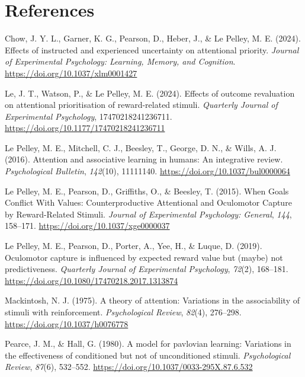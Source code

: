 \documentclass[11pt]{article}
\newlength{\cslhangindent}
\newenvironment{CSLReferences}[2] %
 {\begin{list}{}{%
  \setlength{\itemindent}{0pt}
  \setlength{\leftmargin}{0pt}
  \setlength{\parsep}{0pt}
  \ifodd #1
   \setlength{\leftmargin}{\cslhangindent}
   \setlength{\itemindent}{-1\cslhangindent}
  \fi
  \setlength{\itemsep}{#2\baselineskip}}}
 {\end{list}}
\begin{document}
\section{References}\label{references}

\label{refs}
\begin{CSLReferences}{1}{0}
Chow, J. Y. L., Garner, K. G., Pearson, D., Heber, J., \& Le Pelley, M.
E. (2024). Effects of instructed and experienced uncertainty on
attentional priority. \emph{Journal of Experimental Psychology:
Learning, Memory, and Cognition}.
\url{https://doi.org/10.1037/xlm0001427}

Le, J. T., Watson, P., \& Le Pelley, M. E. (2024). Effects of outcome
revaluation on attentional prioritisation of reward-related stimuli.
\emph{Quarterly Journal of Experimental Psychology}, 17470218241236711.
\url{https://doi.org/10.1177/17470218241236711}

Le Pelley, M. E., Mitchell, C. J., Beesley, T., George, D. N., \& Wills,
A. J. (2016). Attention and associative learning in humans: An
integrative review. \emph{Psychological Bulletin}, \emph{142}(10),
11111140. \url{https://doi.org/10.1037/bul0000064}

Le Pelley, M. E., Pearson, D., Griffiths, O., \& Beesley, T. (2015).
When Goals Conflict With Values: Counterproductive Attentional and
Oculomotor Capture by Reward-Related Stimuli. \emph{Journal of
Experimental Psychology: General}, \emph{144}, 158--171.
\url{https://doi.org/10.1037/xge0000037}

Le Pelley, M. E., Pearson, D., Porter, A., Yee, H., \& Luque, D. (2019).
Oculomotor capture is influenced by expected reward value but (maybe)
not predictiveness. \emph{Quarterly Journal of Experimental Psychology},
\emph{72}(2), 168--181.
\url{https://doi.org/10.1080/17470218.2017.1313874}

Mackintosh, N. J. (1975). A theory of attention: Variations in the
associability of stimuli with reinforcement. \emph{Psychological
Review}, \emph{82}(4), 276--298. \url{https://doi.org/10.1037/h0076778}

Pearce, J. M., \& Hall, G. (1980). A model for pavlovian learning:
Variations in the effectiveness of conditioned but not of unconditioned
stimuli. \emph{Psychological Review}, \emph{87}(6), 532--552.
\url{https://doi.org/10.1037/0033-295X.87.6.532}


\end{CSLReferences}
\end{document}
